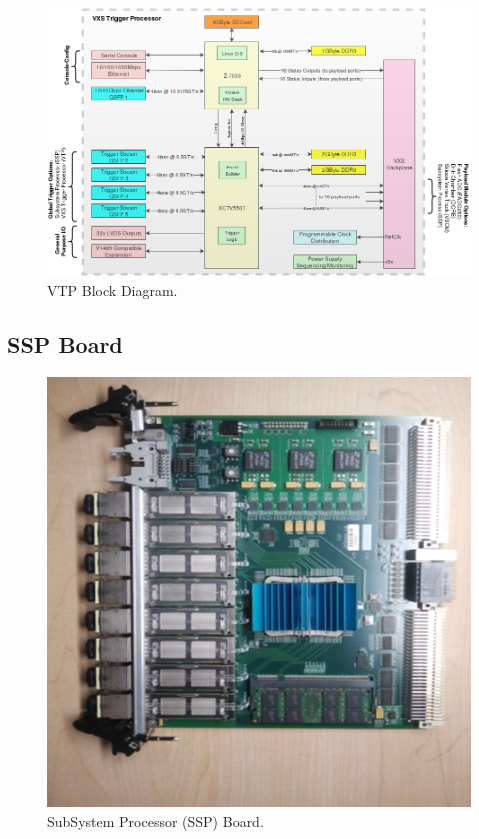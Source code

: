 \begin{figure}[hbt]
	\centering
	\includegraphics[width=1.0\columnwidth,keepaspectratio]{img/vtp_block_daq.png}
	\caption{VTP Block Diagram.}
	\label{fig:vtp_block_daq}
\end{figure}


\subsection{SSP Board}

\begin{figure}[hbt]
	\centering
	\includegraphics[width=1.0\columnwidth,keepaspectratio]{img/ssp_board.png}
	\caption{SubSystem Processor (SSP) Board.}
	\label{fig:ssp_board}
\end{figure}

